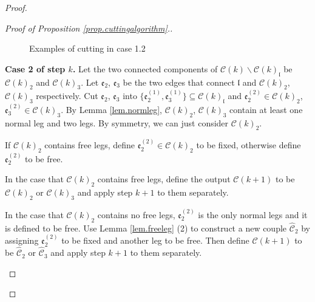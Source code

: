 \begin{proof}
\begin{proof}[Proof of Proposition \ref{prop.cuttingalgorithm}.]
\begin{mdframed}
\begin{figure}[H]
{
    }
        \caption{Examples of cutting in case 1.2}
        \label{fig.step1case1.2}
    \end{figure}

\textbf{Case 2 of step $k$.} Let the two connected components of $\mathcal{C}(k)\backslash \mathcal{C}(k)_{\mathfrak{l}}$ be $\mathcal{C}(k)_2$ and $\mathcal{C}(k)_3$. Let $\mathfrak{e}_{2}$, $\mathfrak{e}_{3}$ be the two edges that connect $\mathfrak{l}$ and  $\mathcal{C}(k)_2$, $\mathcal{C}(k)_3$ respectively. Cut
$\mathfrak{e}_{2}$, $\mathfrak{e}_{3}$ into $\{\mathfrak{e}_{2}^{(1)},\mathfrak{e}_{3}^{(1)}\}\subseteq \mathcal{C}(k)_{\mathfrak{l}}$ and $\mathfrak{e}_{2}^{(2)}\in \mathcal{C}(k)_2$, $\mathfrak{e}_{3}^{(2)}\in \mathcal{C}(k)_3$. 
By Lemma \ref{lem.normleg}, $\mathcal{C}(k)_2$, $\mathcal{C}(k)_3$ contain at least one normal leg and two legs. By symmetry, we can just consider $\mathcal{C}(k)_2$. 

If $\mathcal{C}(k)_2$ contains free legs, define $\mathfrak{e}_{2}^{(2)}\in \mathcal{C}(k)_2$ to be fixed, otherwise define $\mathfrak{e}_{2}^{(2)}$ to be free. 

In the case that $\mathcal{C}(k)_2$ contains free legs, define the output $\mathcal{C}(k+1)$ to be $\mathcal{C}(k)_2$ or $\mathcal{C}(k)_3$ and apply step $k+1$ to them separately. 

In the case that $\mathcal{C}(k)_2$ contains no free legs, $\mathfrak{e}_{2}^{(2)}$ is the only normal legs and it is defined to be free. Use Lemma \ref{lem.freeleg} (2) to construct a new couple $\widehat{\mathcal{C}}_2$ by assigning $\mathfrak{e}_2^{(2)}$ to be fixed and another leg to be free. Then define $\mathcal{C}(k+1)$ to be $\widehat{\mathcal{C}}_2$ or $\widehat{\mathcal{C}}_3$ and apply step $k+1$ to them separately. 


\end{mdframed}
\end{proof}
\end{proof}
